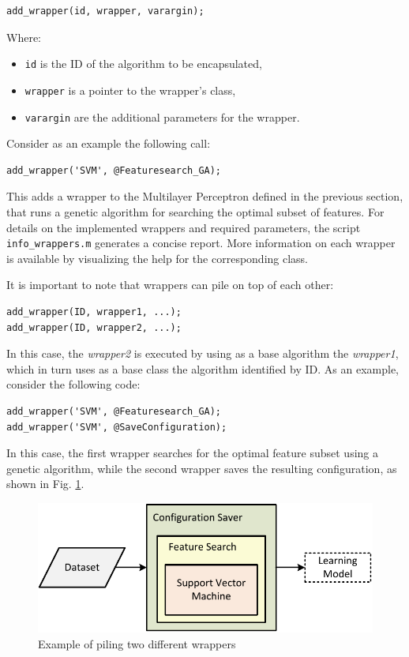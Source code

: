 \begin{lstlisting}
add_wrapper(id, wrapper, varargin);
\end{lstlisting}

\noindent Where:

\begin{itemize}
\item \verb|id| is the ID of the algorithm to be encapsulated,
\item \verb|wrapper| is a pointer to the wrapper’s class,
\item \verb|varargin| are the additional parameters for the wrapper.
\end{itemize}

\noindent Consider as an example the following call:
\begin{lstlisting}
add_wrapper('SVM', @Featuresearch_GA);
\end{lstlisting}

\noindent This adds a wrapper to the Multilayer Perceptron defined in the previous section, that runs a genetic algorithm for searching the optimal subset of features. For details on the implemented wrappers and required parameters, the script \verb|info_wrappers.m| generates a concise report. More information on each wrapper is available by visualizing the help for the corresponding class.

It is important to note that wrappers can pile on top of each other:

\begin{lstlisting}
add_wrapper(ID, wrapper1, ...);
add_wrapper(ID, wrapper2, ...);
\end{lstlisting}

In this case, the \textit{wrapper2} is executed by using as a base algorithm the \textit{wrapper1}, which in turn uses as a base class the algorithm identified by ID. As an example, consider the following code:

\begin{lstlisting}
add_wrapper('SVM', @Featuresearch_GA);
add_wrapper('SVM', @SaveConfiguration);
\end{lstlisting}

\noindent In this case, the first wrapper searches for the optimal feature subset using a genetic algorithm, while the second wrapper saves the resulting configuration, as shown in Fig. \ref{fig:wrappersexample}.

\begin{figure}[t]
\centering
\includegraphics[scale=0.6]{./images/WrappersExample}
\caption{Example of piling two different wrappers}
\label{fig:wrappersexample}
\end{figure}

